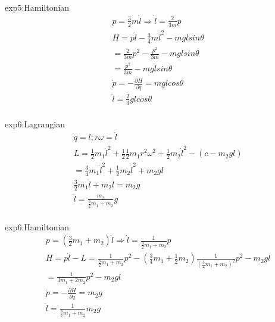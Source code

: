 \documentclass{article}
\begin{document}
exp5:Hamiltonian
\begin{align*}
&p=\frac32m\dot l\Rightarrow \dot l=\frac2{3m}p \\
&H=p\dot l-\frac34m\dot l^2-mglsin\theta \\
&=\frac2{3m}p^2-\frac{p^2}{3m}-mglsin\theta \\
&=\frac{p^2}{3m}-mglsin\theta\\
&\dot p=-\frac{ \partial H}{ \partial q}=mglcos\theta \\
&\ddot l=\frac2{3}glcos\theta \\
\end{align*}

exp6:Lagrangian
\begin{align*}
&q=l ;r\omega =\dot l\\
&L=\frac12m_1\dot l^2+\frac12\frac12m_1r^2\omega^2+\frac12m_2\dot l^2-(c-m_2gl) \\
& =\frac34m_1\dot l^2+\frac12m_2\dot l^2+m_2gl \\
&\frac32m_1\ddot l+m_2 \ddot l=m_2 g \\
&\ddot l=\frac{m_2}{\frac32m_1+m_2}g \\
\end{align*}

exp6:Hamiltonian
\begin{align*}
&p=(\frac32m_1+m_2)\dot l\Rightarrow \dot l=\frac{1}{\frac32m_1+m_2}p \\
&H=p\dot l-L=\frac1{\frac32 m_1+m_2}p^2-(\frac34m_1+\frac12m_2)\frac1{(\frac32m_1+m_2)^2}p^2-m_2gl \\
&=\frac1{3 m_1+2m_2}p^2-m_2gl \\
&\dot p=-\frac{ \partial H}{ \partial q}=m_2g \\
&\ddot l=\frac1{\frac32m_1+m_2}m_2g \\
\end{align*}
\end{document}
